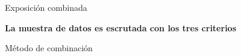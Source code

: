 % 
% 
% 
% 
\begin{frame}{Exposici\'on combinada}
	\begin{alertblock}{}
		\begin{center}
			\textbf{La muestra de datos es escrutada con los tres criterios}
		\end{center}
	\end{alertblock}
	\begin{block}{M\'etodo de combinaci\'on}
		\begin{center}
		\end{center}
	\end{block}
\end{frame}
% 

